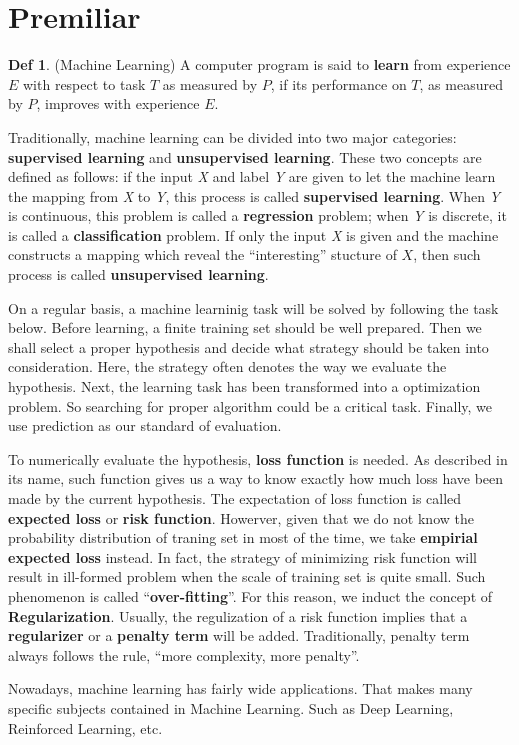 \documentclass{book}
\begin{document}
\theoremstyle{definition} 
\newtheorem{define}{Def}[section]

\theoremstyle{plain} 
\newtheorem{thm}{Theorem}[section] \newtheorem{lema}{Lemma}[chapter] \newtheorem{cor}{Corollary}[chapter]
\newtheorem{prop}{Property}[chapter] \newtheorem{fact}{Fact}[chapter] 


\mainmatter

\chapter*{Premiliar}

\begin{define}(Machine Learning)
    A computer program is said to \textbf{learn} from experience $E$ with respect to task $T$ as measured by $P$, if its performance on $T$,
    as measured by $P$, improves with experience $E$.
\end{define}

\par
Traditionally, machine learning can be divided into two major categories: \textbf{supervised learning} and \textbf{unsupervised learning}. These two concepts are defined as follows:
if the input \textit{X} and label \textit{Y} are given to let the machine learn the mapping from \textit{X} to \textit{Y}, this process is called \textbf{supervised learning}. When
\textit{Y} is continuous, this problem is called a \textbf{regression} problem; when \textit{Y} is discrete, it is called a \textbf{classification} problem. If only the input \textit{X}
is given and the machine constructs a mapping which reveal the ``interesting'' stucture of $X$, then such process is called \textbf{unsupervised learning}.

On a regular basis, a machine learninig task will be solved by following the task below. Before learning, a finite training set should be well prepared. Then we shall select a proper hypothesis and
decide what strategy should be taken into consideration. Here, the strategy often denotes the way we evaluate the hypothesis. Next, the learning task has been transformed into a optimization problem. So searching for proper algorithm could be a critical task. Finally,
we use prediction as our standard of evaluation.

To numerically evaluate the hypothesis, \textbf{loss function} is needed. As described in its name, such function gives us a way to know exactly how much loss have been made by the current hypothesis.
The expectation of loss function is called \textbf{expected loss} or \textbf{risk function}. Howerver, given that we do not know the probability distribution of traning set in most of the time, we take \textbf{empirial expected loss}
instead. In fact, the strategy of minimizing risk function will result in ill-formed problem when the scale of training set is quite small. Such phenomenon is called ``\textbf{over-fitting}''. For this 
reason, we induct the concept of \textbf{Regularization}. Usually, the regulization of a risk function implies that a \textbf{regularizer} or a \textbf{penalty term} will be added. Traditionally, 
penalty term always follows the rule, ``more complexity, more penalty''.

Nowadays, machine learning has fairly wide applications. That makes many specific subjects contained in Machine Learning. Such as Deep Learning, Reinforced Learning, etc.




\end{document}

